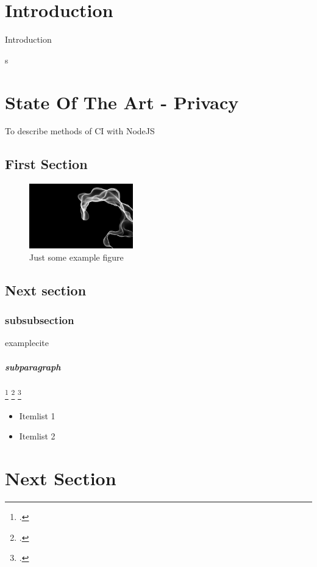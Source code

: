 \section{Introduction}
Introduction

s\newpage

\section{State Of The Art - Privacy}
\label{section:Introduction}
To describe methods of CI with NodeJS

\subsection{First Section}

\begin{figure}[h!]
  \centering
      \includegraphics[width=0.4\textwidth]{images/Perlin-Coherent.png}
  \caption{Just some example figure}
\end{figure}

\subsection{Next section}

\subsubsection{subsubsection}
 examplecite \cite{danezis2015privacy}

\subparagraph{subparagraph}
\footcite{hansen2012top}
\footcite{rost2009datenschutz}
\footcite{probst2012generische}

\begin{itemize}
  \item Itemlist 1
  \item Itemlist 2
\end{itemize} \cite{cranorplatform}

\section{Next Section}
\label{section:Label}

